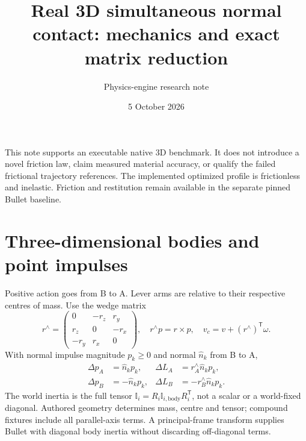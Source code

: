 \documentclass[11pt]{article}
\title{Real 3D simultaneous normal contact: mechanics and exact matrix reduction}
\author{Physics-engine research note}
\date{5 October 2026}
\begin{document}
\maketitle
\noindent This note supports an executable native 3D benchmark. It does not
introduce a novel friction law, claim measured material accuracy, or qualify the
failed frictional trajectory references. The implemented optimized profile is
frictionless and inelastic. Friction and restitution remain available in the
separate pinned Bullet baseline.

\section{Three-dimensional bodies and point impulses}
Positive action goes from B to A. Lever arms are relative to their respective
centres of mass. Use the wedge matrix
\begin{equation}
 r^{\wedge}=\begin{pmatrix}0&-r_z&r_y\\r_z&0&-r_x\\-r_y&r_x&0\end{pmatrix},
 \quad r^{\wedge}p=r\times p,
 \quad v_c=v+(r^{\wedge})^{\mathsf T}\omega.
\end{equation}
With normal impulse magnitude $p_k\geq0$ and normal $\hat n_k$ from B to A,
\begin{align}
 \Delta p_A&=\hat n_k p_k,&\Delta L_A&=r_A^{\wedge}\hat n_k p_k,\\
 \Delta p_B&=-\hat n_k p_k,&\Delta L_B&=-r_B^{\wedge}\hat n_k p_k.
\end{align}
The world inertia is the full tensor
$\mathbb I_i=R_i\mathbb I_{i,\mathrm{body}}R_i^{\mathsf T}$, not a scalar
or a world-fixed diagonal. Authored geometry determines mass, centre and tensor;
compound fixtures include all parallel-axis terms. A principal-frame transform
supplies Bullet with diagonal body inertia without discarding off-diagonal terms.
\end{document}
